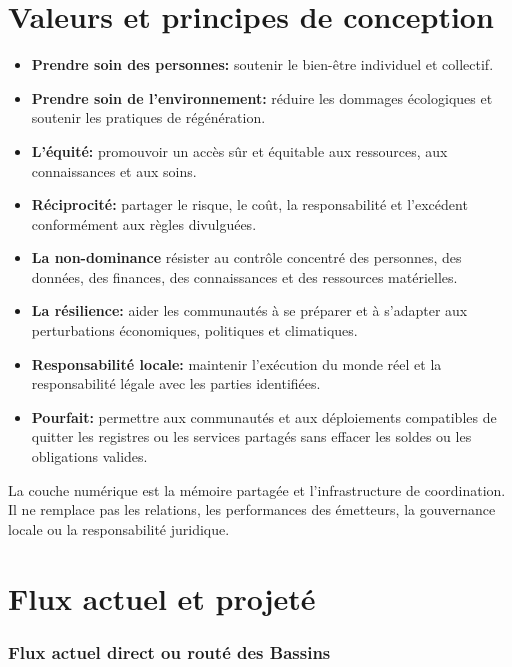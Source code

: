 \documentclass[11pt]{article}
\begin{document}
\section*{Valeurs et principes de conception}

\begin{itemize}[leftmargin=*]
\item \textbf{Prendre soin des personnes:} soutenir le bien-être individuel et collectif.
\item \textbf{Prendre soin de l'environnement:} réduire les dommages écologiques et soutenir les pratiques de régénération.
\item \textbf{L'équité:} promouvoir un accès sûr et équitable aux ressources, aux connaissances et aux soins.
\item \textbf{Réciprocité:} partager le risque, le coût, la responsabilité et l'excédent conformément aux règles divulguées.
\item \textbf{La non-dominance} résister au contrôle concentré des personnes, des données, des finances, des connaissances et des ressources matérielles.
\item \textbf{La résilience:} aider les communautés à se préparer et à s'adapter aux perturbations économiques, politiques et climatiques.
\item \textbf{Responsabilité locale:} maintenir l'exécution du monde réel et la responsabilité légale avec les parties identifiées.
\item \textbf{Pourfait:} permettre aux communautés et aux déploiements compatibles de quitter les registres ou les services partagés sans effacer les soldes ou les obligations valides.
\end{itemize}
La couche numérique est la mémoire partagée et l'infrastructure de coordination. Il ne remplace pas les relations, les performances des émetteurs, la gouvernance locale ou la responsabilité juridique.

\section*{Flux actuel et projeté}

\subsubsection*{Flux actuel direct ou routé des Bassins}
\end{document}
